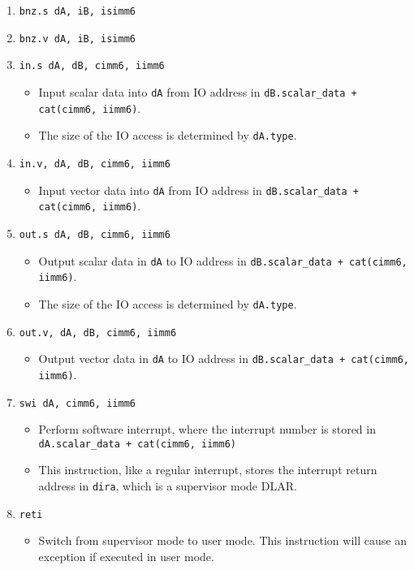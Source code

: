 \documentclass{article}
\begin{document}
\begin{itemize}
\begin{enumerate}
			\item \texttt{bnz.s dA, iB, isimm6}
			\item \texttt{bnz.v dA, iB, isimm6}
			\item \texttt{in.s dA, dB, cimm6, iimm6}
				\begin{itemize}
				\item Input scalar data into \texttt{dA} from IO address in
					\texttt{dB.scalar\_data + cat(cimm6, iimm6)}.
				\item The size of the IO access is determined by
					\texttt{dA.type}.
				\end{itemize}
			\item \texttt{in.v, dA, dB, cimm6, iimm6}
				\begin{itemize}
				\item Input vector data into \texttt{dA} from IO address in
					\texttt{dB.scalar\_data + cat(cimm6, iimm6)}.
				\end{itemize}

			\item \texttt{out.s dA, dB, cimm6, iimm6}
				\begin{itemize}
				\item Output scalar data in \texttt{dA} to IO address in
					\texttt{dB.scalar\_data + cat(cimm6, iimm6)}.
				\item The size of the IO access is determined by
					\texttt{dA.type}.
				\end{itemize}
			\item \texttt{out.v, dA, dB, cimm6, iimm6}
				\begin{itemize}
				\item Output vector data in \texttt{dA} to IO address in
					\texttt{dB.scalar\_data + cat(cimm6, iimm6)}.
				\end{itemize}
			\item \texttt{swi dA, cimm6, iimm6}
				\begin{itemize}
				\item Perform software interrupt, where the interrupt
					number is stored in
					\texttt{dA.scalar\_data + cat(cimm6, iimm6)}
				\item This instruction, like a regular interrupt, stores
					the interrupt return address in \texttt{dira}, which is
					a supervisor mode DLAR.
				\end{itemize}
			\item \texttt{reti}
				\begin{itemize}
				\item Switch from supervisor mode to user mode.  This
					instruction will cause an exception if executed in user
					mode. 
				\end{itemize}


\end{enumerate}
\end{itemize}
\end{document}
